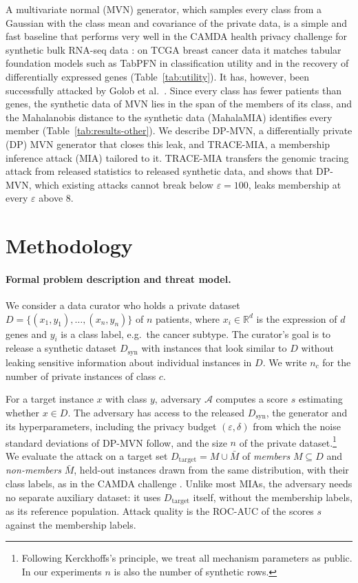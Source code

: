 \documentclass{article}
\newcommand{\dpmvn}{DP-MVN}
\newcommand{\ours}{TRACE-MIA}
\begin{document}
A multivariate normal (MVN) generator, which samples every class from a Gaussian with the class mean and covariance of the private data, is a simple and fast baseline that performs very well in the CAMDA health privacy challenge for synthetic bulk RNA-seq data \cite{menzies2025}: on TCGA breast cancer data it matches tabular foundation models such as TabPFN \cite{hollmann2025tabpfn} in classification utility and in the recovery of differentially expressed genes (Table~\ref{tab:utility}). It has, however, been successfully attacked by Golob et al.~\cite{golob2026synthetic}. Since every class has fewer patients than genes, the synthetic data of MVN lies in the span of the members of its class, and the Mahalanobis distance to the synthetic data (MahalaMIA) identifies every member (Table~\ref{tab:results-other}). We describe \dpmvn{}, a differentially private (DP) MVN generator that closes this leak, and \ours{}, a membership inference attack (MIA) tailored to it. \ours{} transfers the genomic tracing attack \cite{homer2008resolving, dwork2015robust} from released statistics to released synthetic data, and shows that \dpmvn{}, which existing attacks cannot break below $\varepsilon=100$, leaks membership at every $\varepsilon$ above $8$.

\section{Methodology}

\paragraph{Formal problem description and threat model.}
We consider a data curator who holds a private dataset $D=\{(x_1,y_1),\dots,(x_n,y_n)\}$ of $n$ patients, where $x_i\in\mathbb{R}^d$ is the expression of $d$ genes and $y_i$ is a class label, e.g.\ the cancer subtype. The curator's goal is to release a synthetic dataset $D_\text{syn}$ with instances that look similar to $D$ without leaking sensitive information about individual instances in $D$. We write $n_c$ for the number of private instances of class $c$.

For a target instance $x$ with class $y$, adversary $\mathcal{A}$ computes a score $s$ estimating whether $x\in D$. The adversary has access to the released $D_\text{syn}$, the generator and its hyperparameters, including the privacy budget $(\varepsilon,\delta)$ from which the noise standard deviations of \dpmvn{} follow, and the size $n$ of the private dataset.\footnote{Following Kerckhoffs's principle, we treat all mechanism parameters as public. In our experiments $n$ is also the number of synthetic rows.} We evaluate the attack on a target set $D_{\mathrm{target}} = M \cup \bar{M}$ of \emph{members} $M\subseteq D$ and \emph{non-members} $\bar{M}$, held-out instances drawn from the same distribution, with their class labels, as in the CAMDA challenge \cite{menzies2025}. Unlike most MIAs, the adversary needs no separate auxiliary dataset: it uses $D_\mathrm{target}$ itself, without the membership labels, as its reference population. Attack quality is the ROC-AUC of the scores $s$ against the membership labels.
\end{document}
